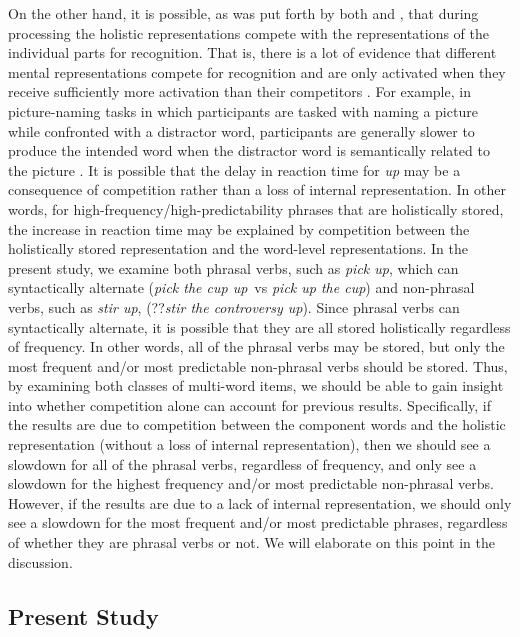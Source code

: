 \documentclass[
  authoryear,
  preprint,
  1p,
  onecolumn]{elsarticle}
\begin{document}
On the other hand, it is possible, as was put forth by both
\citet{kapatsinski2009} and \citet{healy1976}, that during processing
the holistic representations compete with the representations of the
individual parts for recognition. That is, there is a lot of evidence
that different mental representations compete for recognition
\citep{oppenheimLexicalCompetitionDemand2019} and are only activated
when they receive sufficiently more activation than their competitors
\citep{mcclellandInteractiveActivationModel1981}. For example, in
picture-naming tasks in which participants are tasked with naming a
picture while confronted with a distractor word, participants are
generally slower to produce the intended word when the distractor word
is semantically related to the picture
\citep{starreveldSemanticInterferenceOrthographic1995, schriefersExploringTimeCourse1990, mcclellandInteractiveActivationModel1981}.
It is possible that the delay in reaction time for \emph{up} may be a
consequence of competition rather than a loss of internal
representation. In other words, for high-frequency/high-predictability
phrases that are holistically stored, the increase in reaction time may
be explained by competition between the holistically stored
representation and the word-level representations. In the present study,
we examine both phrasal verbs, such as \emph{pick up}, which can
syntactically alternate (\emph{pick the cup up}~vs \emph{pick up the
cup}) and non-phrasal verbs, such as \emph{stir up}, (??\emph{stir the
controversy up}). Since phrasal verbs can syntactically alternate, it is
possible that they are all stored holistically regardless of frequency.
In other words, all of the phrasal verbs may be stored, but only the
most frequent and/or most predictable non-phrasal verbs should be
stored. Thus, by examining both classes of multi-word items, we should
be able to gain insight into whether competition alone can account for
previous results. Specifically, if the results are due to competition
between the component words and the holistic representation (without a
loss of internal representation), then we should see a slowdown for all
of the phrasal verbs, regardless of frequency, and only see a slowdown
for the highest frequency and/or most predictable non-phrasal verbs.
However, if the results are due to a lack of internal representation, we
should only see a slowdown for the most frequent and/or most predictable
phrases, regardless of whether they are phrasal verbs or not. We will
elaborate on this point in the discussion.

\subsection{Present Study}\label{present-study}
\end{document}
